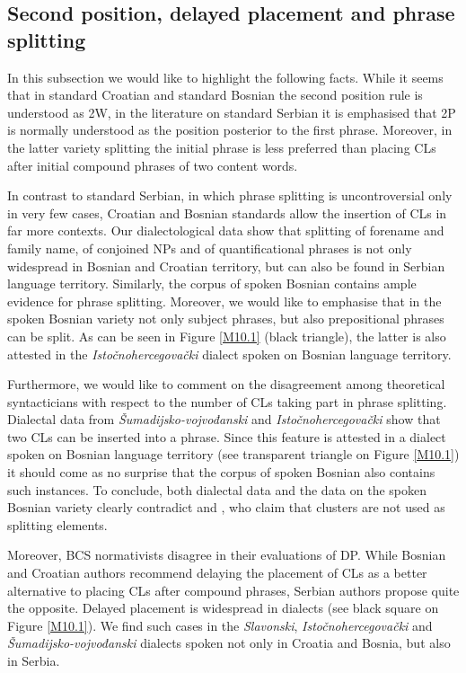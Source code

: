 \subsection{Second position, delayed placement and phrase splitting}
\label{sec:10.2.4}
In this subsection we would like to highlight the following facts. While it seems that in standard Croatian and standard Bosnian the second position rule is understood as 2W, in the literature on standard Serbian it is emphasised that 2P is normally understood as the position posterior to the first phrase. Moreover, in the latter variety splitting the initial phrase is less preferred than placing CLs after initial compound phrases of two content words. 

In contrast to standard Serbian, in which phrase splitting is uncontroversial only in very few cases, Croatian and Bosnian standards allow the insertion of CLs in far more contexts. Our dialectological data show that splitting of forename and family name, of conjoined NPs and of quantificational phrases is not only widespread in Bosnian and Croatian territory, but can also be found in Serbian language territory. Similarly, the corpus of spoken Bosnian contains ample evidence for phrase splitting. Moreover, we would like to emphasise that in the spoken Bosnian variety not only subject phrases, but also prepositional phrases can be split. As can be seen in Figure \ref{M10.1} (black triangle), the latter is also attested in the \textit{Istočnohercegovački} dialect spoken on Bosnian language territory.  

Furthermore, we would like to comment on the disagreement among theoretical syntacticians with respect to the number of CLs taking part in phrase splitting. Dialectal data from \textit{Šumadijsko-vojvođanski} and \textit{Istočnohercegovački} show that two CLs can be inserted into a phrase. Since this feature is attested in a dialect spoken on Bosnian language territory (see transparent triangle on Figure \ref{M10.1}) it should come as no surprise that the corpus of spoken Bosnian also contains such instances. To conclude, both dialectal data and the data on the spoken Bosnian variety clearly contradict \citet{Progovac96} and \citet{RadanovicKocic88, RadanovicKocic96}, who claim that clusters are not used as splitting elements.

Moreover, BCS normativists disagree in their evaluations of DP. While Bosnian and Croatian authors recommend delaying the placement of CLs as a better alternative to placing CLs after compound phrases, Serbian authors propose quite the opposite. Delayed placement is widespread in dialects (see black square on Figure \ref{M10.1}). We find such cases in the \textit{Slavonski}, \textit{Istočnohercegovački} and \textit{Šu\-ma\-dij\-sko-vojvođanski} dialects spoken not only in Croatia and Bosnia, but also in Serbia.


